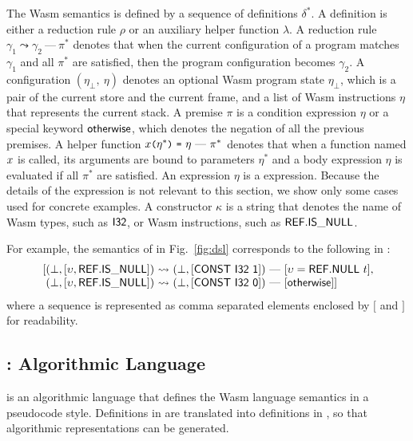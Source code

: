The Wasm semantics is defined by a sequence of definitions $\delta^*$.
A definition is either a reduction rule $\rho$ or an auxiliary helper function $\lambda$.
A reduction rule $\gamma_1 \leadsto \gamma_2\ \mbox{---}\ \pi^*$ denotes that
when the current configuration of a program matches $\gamma_1$ and
all $\pi^*$ are satisfied, then the program configuration becomes $\gamma_2$.
A configuration $(\eta_\bot,\ \eta)$ denotes an optional Wasm program state $\eta_\bot$,
which is a pair of the current store and the current frame,
and a list of Wasm instructions $\eta$ that represents the current stack.
A premise $\pi$ is a condition expression $\eta$ or a special keyword
\ensuremath{\mathsf{\small otherwise}},
which denotes the negation of all the previous premises.
A helper function $x \texttt{\small (} \eta^* \texttt{\small )}\ \texttt{\small =}\ \eta\ \mbox{---}\ \pi^*$ denotes that
when a function named $x$ is called, its arguments are bound to parameters $\eta^*$
and a body expression $\eta$ is evaluated if all $\pi^*$ are satisfied.
An expression $\eta$ is a \dl expression.
Because the details of the expression is not relevant to this section,
we show only some cases used for concrete examples.
A constructor $\kappa$ is a string that denotes the name of
Wasm types, such as $\mathsf{I32}$, or Wasm instructions, such as $\mathsf{REF.IS\_NULL}$.

For example, the semantics of 
in Fig.~\ref{fig:dsl} corresponds to the following in \dl:
\[
\begin{array}{l@{}l@{~}c@{~}l}
[&(\bot, [\upsilon, \ssf{REF.IS\_NULL}]) &\leadsto& (\bot, [\ssf{CONST\ I32\ 1}])\
\mbox{---}\ [\upsilon = \ssf{REF.NULL}\ t],\\
&(\bot, [\upsilon, \ssf{REF.IS\_NULL}])&\leadsto&(\bot, [\ssf{CONST\ I32\ 0}])\
\mbox{---}\ [\ssf{\small otherwise}] ]
\end{array}
\]
where a sequence is represented as comma separated elements
enclosed by $[$ and $]$ for readability.

\subsection{\al: Algorithmic Language}\label{sec:aldef}
\al is an algorithmic language that defines the Wasm language semantics in a pseudocode style.
Definitions in \dl are translated into definitions in \al,
so that algorithmic representations can be generated.

